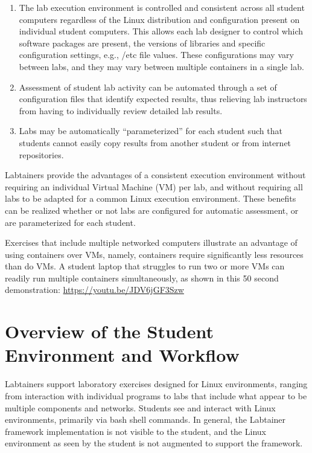 \documentclass[12pt]{article}
\begin{document}
\begin{enumerate}
\item The lab execution environment is controlled and consistent
across all student computers regardless of the Linux distribution
and configuration present on individual student computers.  
This allows each lab designer to control
which software packages are present, the versions of libraries and
specific configuration settings, e.g., /etc file values. These configurations
may vary between labs, and they may vary between multiple containers in
a single lab.

\item Assessment of student lab activity can be automated through a
set of configuration files that identify expected results, thus
relieving lab instructors from having to individually review detailed lab
results.

\item Labs may be automatically ``parameterized'' for each student such that
students cannot easily copy results from another student or from internet
repositories.  
\end{enumerate}

Labtainers provide the advantages of a consistent
execution environment without requiring
an individual Virtual Machine (VM) per lab, and without requiring all labs to be adapted for
a common Linux execution environment.   These benefits can be realized 
whether or not labs are configured for automatic assessment, 
or are parameterized for each student.

Exercises that include multiple networked computers illustrate an advantage 
of using containers over VMs, namely, containers require significantly less resources
than do VMs.  A student laptop that struggles to run two or more VMs can readily 
run multiple containers simultaneously, as shown in this 50 second demonstration: \url{https://youtu.be/JDV6jGF3Szw} 

\section {Overview of the Student Environment and Workflow}
Labtainers support laboratory exercises designed for Linux environments,
ranging from interaction with individual programs to labs that include
what appear to be multiple components and networks.  Students see and interact with Linux
environments, primarily via bash shell commands. In general, the Labtainer
framework implementation is not visible to the student, and the Linux
environment as seen by the student is not augmented to support the framework.
\end{document}
